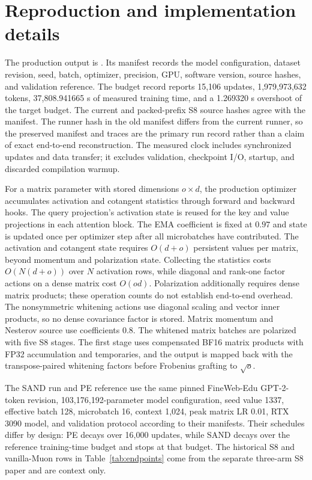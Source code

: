 \documentclass[10pt]{article}
\begin{document}
\section{Reproduction and implementation details}\label{app:repro}
The production output is . Its manifest records the model configuration, dataset revision, seed, batch, optimizer, precision, GPU, software version, source hashes, and validation reference. The budget record reports 15,106 updates, 1,979,973,632 tokens, 37,808.941665 s of measured training time, and a 1.269320 s overshoot of the target budget. The current  and packed-prefix S8 source hashes agree with the manifest. The runner hash in the old manifest differs from the current runner, so the preserved manifest and traces are the primary run record rather than a claim of exact end-to-end reconstruction. The measured clock includes synchronized updates and data transfer; it excludes validation, checkpoint I/O, startup, and discarded compilation warmup.

For a matrix parameter with stored dimensions $o\times d$, the production optimizer accumulates activation and cotangent statistics through forward and backward hooks. The query projection's activation state is reused for the key and value projections in each attention block. The EMA coefficient is fixed at $0.97$ and state is updated once per optimizer step after all microbatches have contributed. The activation and cotangent state requires $O(d+o)$ persistent values per matrix, beyond momentum and polarization state. Collecting the statistics costs $O(N(d+o))$ over $N$ activation rows, while diagonal and rank-one factor actions on a dense matrix cost $O(od)$. Polarization additionally requires dense matrix products; these operation counts do not establish end-to-end overhead. The nonsymmetric whitening actions use diagonal scaling and vector inner products, so no dense covariance factor is stored. Matrix momentum and Nesterov source use coefficients $0.8$. The whitened matrix batches are polarized with five S8 stages. The first stage uses compensated BF16 matrix products with FP32 accumulation and temporaries, and the output is mapped back with the transpose-paired whitening factors before Frobenius grafting to $\sqrt{o}$.

The SAND run and PE reference use the same pinned FineWeb-Edu GPT-2-token revision, 103,176,192-parameter model configuration, seed value 1337, effective batch 128, microbatch 16, context 1,024, peak matrix LR 0.01, RTX 3090 model, and validation protocol according to their manifests. Their schedules differ by design: PE decays over 16,000 updates, while SAND decays over the reference training-time budget and stops at that budget. The historical S8 and vanilla-Muon rows in Table~\ref{tab:endpoints} come from the separate three-arm S8 paper and are context only.
\end{document}
